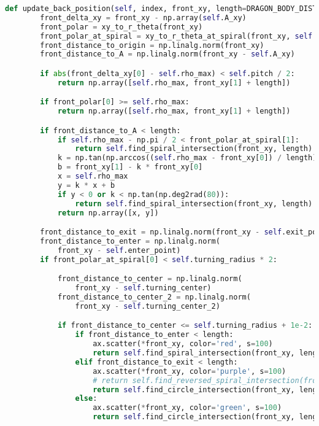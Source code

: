 \begin{lstlisting}[language=python]
    def update_back_position(self, index, front_xy, length=DRAGON_BODY_DISTANCE):
        front_delta_xy = front_xy - np.array(self.A_xy)
        front_polar = xy_to_r_theta(front_xy)
        front_polar_at_spiral = xy_to_r_theta_at_spiral(front_xy, self.b)
        front_distance_to_origin = np.linalg.norm(front_xy)
        front_distance_to_A = np.linalg.norm(front_xy - self.A_xy)

        if abs(front_delta_xy[0] - self.rho_max) < self.pitch / 2:
            return np.array([self.rho_max, front_xy[1] + length])

        if front_polar[0] >= self.rho_max:
            return np.array([self.rho_max, front_xy[1] + length])

        if front_distance_to_A < length:
            if self.rho_max - np.pi / 2 < front_polar_at_spiral[1]:
                return self.find_spiral_intersection(front_xy, length)
            k = np.tan(np.arccos((self.rho_max - front_xy[0]) / length))
            b = front_xy[1] - k * front_xy[0]
            x = self.rho_max
            y = k * x + b
            if y < 0 or k < np.tan(np.deg2rad(80)):
                return self.find_spiral_intersection(front_xy, length)
            return np.array([x, y])

        front_distance_to_exit = np.linalg.norm(front_xy - self.exit_point)
        front_distance_to_enter = np.linalg.norm(
            front_xy - self.enter_point)
        if front_polar_at_spiral[0] < self.turning_radius * 2:

            front_distance_to_center = np.linalg.norm(
                front_xy - self.turning_center)
            front_distance_to_center_2 = np.linalg.norm(
                front_xy - self.turning_center_2)

            if front_distance_to_center <= self.turning_radius + 1e-2:
                if front_distance_to_enter < length:
                    ax.scatter(*front_xy, color='red', s=100)
                    return self.find_spiral_intersection(front_xy, length, check_on_polar=False)
                elif front_distance_to_exit < length:
                    ax.scatter(*front_xy, color='purple', s=100)
                    # return self.find_reversed_spiral_intersection(front_xy, length, check_on_polar=False)
                    return self.find_circle_intersection(front_xy, length, self.turning_center_2, self.turning_radius, reverse=True)
                else:
                    ax.scatter(*front_xy, color='green', s=100)
                    return self.find_circle_intersection(front_xy, length, self.turning_center, self.turning_radius)


\end{lstlisting}
